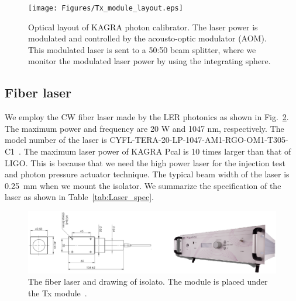 \begin{figure}
\begin{center}
\texttt{[image: Figures/Tx\_module\_layout.eps]}
\caption{Optical layout of KAGRA photon calibrator. The laser power is modulated and controlled by the acousto-optic modulator (AOM). This modulated laser is sent to a 50:50 beam splitter, where we monitor the modulated laser power by using the integrating sphere.} 
\label{fig:Tx_module_layout} 
\end{center}
\end{figure}

\subsection{Fiber laser}
We employ the CW fiber laser made by the LER photonics as shown in Fig.~\ref{fig:Laser}. The maximum power and frequency are 20 W and 1047 nm, respectively. The model number of the laser is CYFL-TERA-20-LP-1047-AM1-RGO-OM1-T305-C1~\cite{Keopsys}. The maximum laser power of KAGRA Pcal is 10 times larger than that of LIGO. This is because that we need the high power laser for the injection test and photon pressure actuator technique. The typical beam width of the laser is 0.25~mm when we mount the isolator. We summarize the specification of the laser as shown in Table~\ref{tab:Laser_spec}.

\begin{figure}
\begin{center}
\includegraphics[width=14cm]{Figures/Laser.eps}
\caption{The fiber laser and drawing of isolato. The module is placed under the Tx module~\cite{Keopsys}.} 
\label{fig:Laser} 
\end{center}
\end{figure}

